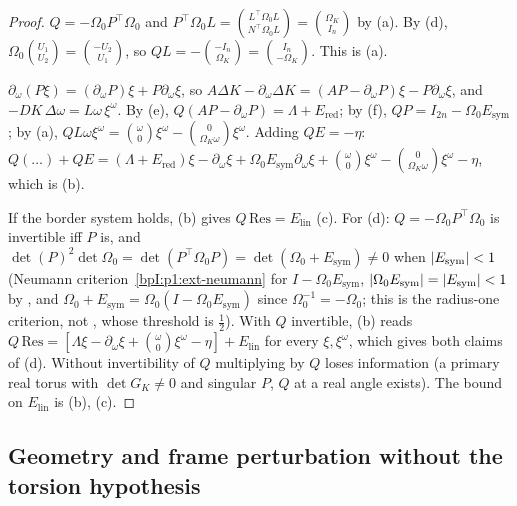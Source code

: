 \begin{proof}
\label{stepI:p1:rd-ql}
$Q=-\Omega_0P^\top\Omega_0$ and $P^\top\Omega_0L=\binom{L^\top\Omega_0L}{N^\top\Omega_0L}=\binom{\Omega_K}{I_n}$ by (a). By
(d), $\Omega_0\binom{U_1}{U_2}=\binom{-U_2}{U_1}$, so $QL=-\binom{-I_n}{\Omega_K}=\binom{I_n}{-\Omega_K}$. This is (a).

\label{stepI:p1:rd-expand}
$\partial_\omega(P\xi)=(\partial_\omega P)\xi+P\partial_\omega\xi$, so $A\Delta K-\partial_\omega\Delta K=(AP-\partial_\omega P)\xi-P\partial_\omega\xi$, and
$-DK\,\Delta\omega=L\omega\,\xi^\omega$. By (e), $Q(AP-\partial_\omega P)=\Lambda+E_{\mathrm{red}}$; by (f),
$QP=I_{2n}-\Omega_0E_{\mathrm{sym}}$; by (a), $QL\omega\xi^\omega=\binom\omega0\xi^\omega-\binom0{\Omega_K\omega}\xi^\omega$. Adding $QE=-\eta$:
$Q(\dots)+QE=(\Lambda+E_{\mathrm{red}})\xi-\partial_\omega\xi+\Omega_0E_{\mathrm{sym}}\partial_\omega\xi+\binom\omega0\xi^\omega-\binom0{\Omega_K\omega}\xi^\omega-\eta$, which is (b).

\label{stepI:p1:rd-consequence}
If the border system holds, (b) gives $Q\,\mathrm{Res}=E_{\mathrm{lin}}$ (c). For (d): $Q=-\Omega_0P^\top\Omega_0$ is
invertible iff $P$ is, and $\det(P)^2\det\Omega_0=\det(P^\top\Omega_0P)=\det(\Omega_0+E_{\mathrm{sym}})\ne0$ when $\lvert E_{\mathrm{sym}}\rvert<1$
(Neumann criterion~\ref{bpI:p1:ext-neumann} for $I-\Omega_0E_{\mathrm{sym}}$, $\lvert \Omega_0E_{\mathrm{sym}}\rvert=\lvert E_{\mathrm{sym}}\rvert<1$ by , and $\Omega_0+E_{\mathrm{sym}}=\Omega_0(I-\Omega_0E_{\mathrm{sym}})$ since $\Omega_0^{-1}=-\Omega_0$; this is the radius-one criterion, not , whose threshold is $\frac12$). With $Q$ invertible,
(b) reads $Q\,\mathrm{Res}=[\Lambda\xi-\partial_\omega\xi+\binom\omega0\xi^\omega-\eta]+E_{\mathrm{lin}}$ for every $\xi,\xi^\omega$, which gives both claims of (d). Without invertibility of $Q$
multiplying by $Q$ loses information (a primary real torus with $\det G_K\ne0$ and singular $P$, $Q$ at a real angle exists). The bound on $E_{\mathrm{lin}}$ is (b), (c).
\end{proof}

\subsection{Geometry and frame perturbation without the torsion hypothesis}\label{bpI:p1:sec-geometry}

